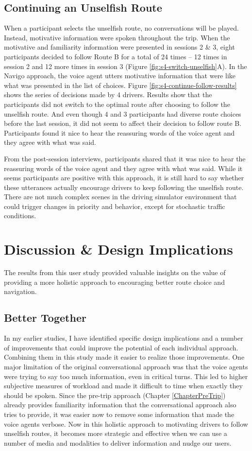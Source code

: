 \subsection{Continuing an Unselfish Route}
When a participant selects the unselfish route, no conversations will be played. Instead, motivative information were spoken throughout the trip. When the motivative and familiarity information were presented in sessions 2 \& 3, eight participants decided to follow Route B for a total of 24 times -- 12 times in session 2 and 12 more times in session 3 (Figure \ref{fig:s4-switch-unselfish}A). In the Navigo approach, the voice agent utters motivative information that were like what was presented in the list of choices. Figure \ref{fig:s4-continue-follow-results} shows the series of decisions made by 4 drivers. Results show that the participants did not switch to the optimal route after choosing to follow the unselfish route. And even though 4 and 3 participants had diverse route choices before the last session, it did not seem to affect their decision to follow route B. Participants found it nice to hear the reassuring words of the voice agent and they agree with what was said. 
 
From the post-session interviews, participants shared that it was nice to hear the reassuring words of the voice agent and they agree with what was said. While it seems participants are positive with this approach, it is still hard to say whether these utterances actually encourage drivers to keep following the unselfish route. There are not much complex scenes in the driving simulator environment that could trigger changes in priority and behavior, except for stochastic traffic conditions. 

\section{Discussion \& Design Implications}
The results from this user study provided valuable insights on the value of providing a more holistic approach to encouraging better route choice and navigation. 

\subsection{Better Together}
In my earlier studies, I have identified specific design implications and a number of improvements that could improve the potential of each individual approach. Combining them in this study made it easier to realize those improvements. One major limitation of the original conversational approach was that the voice agents were trying to say too much information, even in critical turns. This led to higher subjective measures of workload and made it difficult to time when exactly they should be spoken. Since the pre-trip approach (Chapter \ref{ChapterPreTrip}) already provides familiarity information that the conversational approach also tries to provide, it was easier now to remove some information that made the voice agents verbose. Now in this holistic approach to motivating drivers to follow unselfish routes, it becomes more strategic and effective when we can use a number of media and modalities to deliver information and nudge our users.

